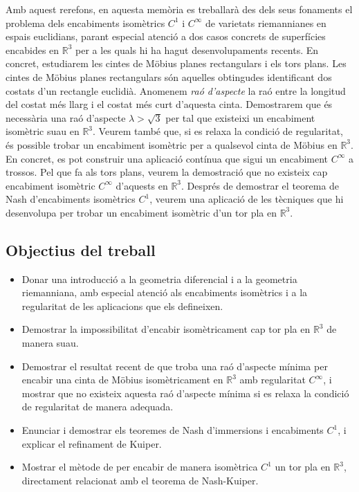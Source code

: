 Amb aquest rerefons, en aquesta memòria es treballarà des dels seus fonaments el problema dels encabiments isomètrics $C^1$ i $C^\infty$ de varietats riemannianes en espais euclidians, parant especial atenció a dos casos concrets de superfícies encabides en $\mathbb R^3$ per a les quals hi ha hagut desenvolupaments recents. En concret, estudiarem les cintes de Möbius planes rectangulars i els tors plans. Les cintes de Möbius planes rectangulars són aquelles obtingudes identificant dos costats d'un rectangle euclidià. Anomenem \textit{raó d'aspecte} la raó entre la longitud del costat més llarg i el costat més curt d'aquesta cinta. Demostrarem que és necessària una raó d'aspecte $\lambda>\sqrt3$ per tal que existeixi un encabiment isomètric suau en $\mathbb R^3$. 
Veurem també que, si es relaxa la condició de regularitat, és possible trobar un encabiment isomètric per a qualsevol cinta de Möbius en $\mathbb R^3$. En concret, es pot construir una aplicació contínua que sigui un encabiment $C^\infty$ a trossos. Pel que fa als tors plans, veurem la demostració que no existeix cap encabiment isomètric $C^\infty$ d'aquests en $\mathbb R^3$. Després de demostrar el teorema de Nash d'encabiments isomètrics $C^1$, veurem una aplicació de les tècniques que hi desenvolupa per trobar un encabiment isomètric d'un tor pla en $\mathbb R^3$.

\subsection*{Objectius del treball}
\begin{itemize}
    \item Donar una introducció a la geometria diferencial i a la geometria riemanniana, amb especial atenció als encabiments isomètrics i a la regularitat de les aplicacions que els defineixen.
    \item Demostrar la impossibilitat d'encabir isomètricament cap tor pla en $\mathbb R^3$ de manera suau.
    \item Demostrar el resultat recent de \citet{schwartz2024} que troba una raó d'aspecte mínima per encabir una cinta de Möbius isomètricament en $\mathbb R^3$ amb regularitat $C^\infty$, i mostrar que no existeix aquesta raó d'aspecte mínima si es relaxa la condició de regularitat de manera adequada.
    \item Enunciar i demostrar els teoremes de Nash d'immersions i encabiments $C^1$, i explicar el refinament de Kuiper.
    \item Mostrar el mètode de \citet{borrelli2013} per encabir de manera isomètrica $C^1$ un tor pla en $\mathbb R^3$, directament relacionat amb el teorema de Nash-Kuiper. 
\end{itemize}

